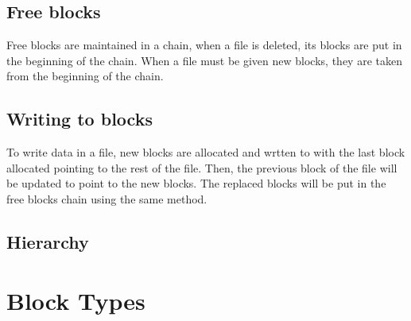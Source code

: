 \documentclass{article}
\begin{document}
\subsection{Free blocks}
Free blocks are maintained in a chain, when a file is deleted, its blocks are put in the beginning of the chain. When a file must be given new blocks, they are taken from the beginning of the chain.
\subsection{Writing to blocks}
To write data in a file, new blocks are allocated and wrtten to with the last block allocated pointing to the rest of the file. Then, the previous block of the file will be updated to point to the new blocks.
The replaced blocks will be put in the free blocks chain using the same method.

\subsection{Hierarchy}

\section{Block Types}
\end{document}
